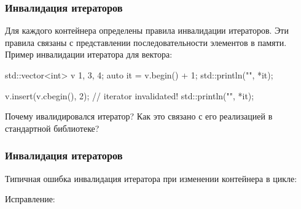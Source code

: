 \documentclass[compress, 8pt]{beamer}
\begin{document}
  \begin{frame}[fragile]

    \frametitle{Инвалидация итераторов}

    Для каждого контейнера определены правила инвалидации
    итераторов.
    Эти правила связаны с представлении последовательности
    элементов в памяти.
    Пример инвалидации итератора для вектора:

    \begin{mycppinplacelisting}
std::vector<int> v {1, 3, 4};
auto it = v.begin() + 1;
std::println("{}", *it);

v.insert(v.cbegin(), 2);
// iterator invalidated!
std::println("{}", *it);
    \end{mycppinplacelisting}

    \begin{task}
      Почему ивалидировался итератор? Как это связано с его реализацией
      в стандартной библиотеке?
    \end{task}

  \end{frame}

  \begin{frame}[fragile]

    \frametitle{Инвалидация итераторов}

    Типичная ошибка \textemdash \space инвалидация итератора
    при изменении контейнера в цикле:


    Исправление:


  \end{frame}
\end{document}
